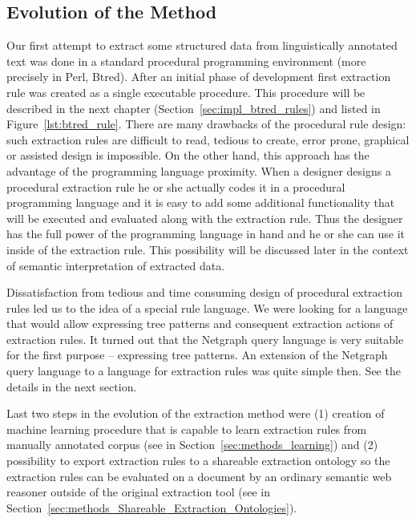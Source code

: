 


\subsection{Evolution of the Method}

Our first attempt to extract some structured data from linguistically annotated text was done in a standard procedural programming environment (more precisely in Perl, Btred). After an initial phase of development first extraction rule was created as a single executable procedure. This procedure will be described in the next chapter (Section~\ref{sec:impl_btred_rules}) and listed in Figure~\ref{lst:btred_rule}. There are many drawbacks of the procedural rule design: such extraction rules are difficult to read, tedious to create, error prone, graphical or assisted design is impossible. On the other hand, this approach has the advantage of the programming language proximity. When a designer designs a procedural extraction rule he or she actually codes it in a procedural programming language and it is easy to add some additional functionality that will be executed and evaluated along with the extraction rule. Thus the designer has the full power of the programming language in hand and he or she can use it inside of the extraction rule. This possibility will be discussed later in the context of semantic interpretation of extracted data.

Dissatisfaction from tedious and time consuming design of procedural extraction rules led us to the idea of a special rule language. We were looking for a language that would allow expressing tree patterns and consequent extraction actions of extraction rules. It turned out that the Netgraph query language is very suitable for the first purpose -- expressing tree patterns. An extension of the Netgraph query language to a language for extraction rules was quite simple then. See the details in the next section.

Last two steps in the evolution of the extraction method were (1) creation of machine learning procedure that is capable to learn extraction rules from manually annotated corpus (see in Section~\ref{sec:methods_learning}) and (2) possibility to export extraction rules to a shareable extraction ontology so the extraction rules can be evaluated on a document by an ordinary semantic web reasoner outside of the original extraction tool (see in Section~\ref{sec:methods_Shareable_Extraction_Ontologies}).


